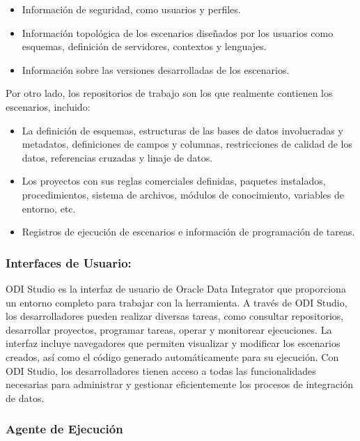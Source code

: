 \begin{itemize}
    \item Información de seguridad, como usuarios y perfiles.
    \item Información topológica de los escenarios diseñados por los usuarios como esquemas, definición de servidores, 
        contextos y lenguajes.
    \item Información sobre las versiones desarrolladas de los escenarios.
\end{itemize}

Por otro lado, los repositorios de trabajo son los que realmente 
contienen los escenarios, incluido: 

\begin{itemize}
    \item La definición de esquemas, estructuras de las bases de datos involucradas y metadatos, 
        definiciones de campos y columnas, restricciones de calidad de los datos, referencias cruzadas y linaje de datos.
    \item Los proyectos con sus reglas comerciales definidas, paquetes instalados, procedimientos, 
        sistema de archivos, módulos de conocimiento, variables de entorno, etc.
    \item Registros de ejecución de escenarios e información de programación de tareas.
\end{itemize}

\subsubsection{Interfaces de Usuario:}

ODI Studio es la interfaz de usuario de Oracle Data Integrator que proporciona un entorno completo para trabajar con la 
herramienta. A través de ODI Studio, los desarrolladores pueden realizar diversas tareas, como consultar repositorios, desarrollar 
proyectos, programar tareas, operar y monitorear ejecuciones. La interfaz incluye navegadores que permiten visualizar y 
modificar los escenarios creados, así como el código generado automáticamente para su ejecución. Con ODI Studio, los 
desarrolladores tienen acceso a todas las funcionalidades necesarias para administrar y gestionar eficientemente los procesos de 
integración de datos. 

\subsubsection{Agente de Ejecución}

